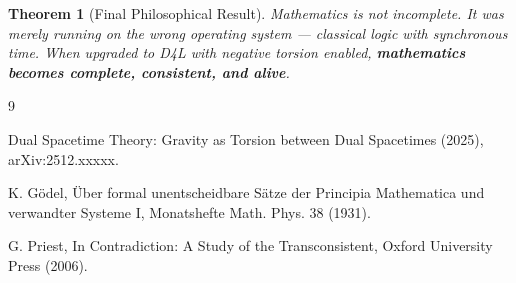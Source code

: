 \documentclass[dvipdfmx,11pt,a4paper]{article}
\newtheorem{theorem}{Theorem}[section]
\theoremstyle{definition}
\begin{document}
\begin{theorem}[Final Philosophical Result]
Mathematics is not incomplete.  
It was merely running on the wrong operating system — classical logic with synchronous time.  
When upgraded to D4L with negative torsion enabled, \textbf{mathematics becomes complete, consistent, and alive}.
\end{theorem}

\begin{thebibliography}{9}

Dual Spacetime Theory: Gravity as Torsion between Dual Spacetimes (2025), arXiv:2512.xxxxx.

K. Gödel, Über formal unentscheidbare Sätze der Principia Mathematica und verwandter Systeme I, Monatshefte Math. Phys. 38 (1931).

G. Priest, In Contradiction: A Study of the Transconsistent, Oxford University Press (2006).

\end{thebibliography}
\end{document}

